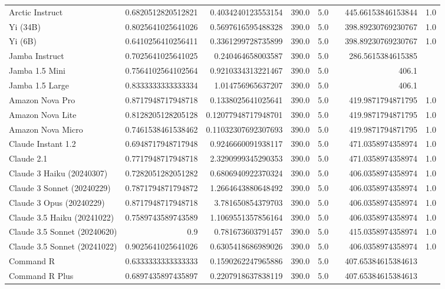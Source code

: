 \begin{table}[htp]
{\begin{tabular}{lrrrrrrr}
Arctic Instruct & 0.6820512820512821 & 0.4034240123553154 & 390.0 & 5.0 &  & 445.66153846153844 & 1.0 \\
Yi (34B) & 0.8025641025641026 & 0.5697616595488328 & 390.0 & 5.0 &  & 398.89230769230767 & 1.0 \\
Yi (6B) & 0.6410256410256411 & 0.3361299728735899 & 390.0 & 5.0 &  & 398.89230769230767 & 1.0 \\
Jamba Instruct & 0.7025641025641025 & 0.240464658003587 & 390.0 & 5.0 &  & 286.5615384615385 &  \\
Jamba 1.5 Mini & 0.7564102564102564 & 0.9210334313221467 & 390.0 & 5.0 &  & 406.1 &  \\
Jamba 1.5 Large & 0.8333333333333334 & 1.014756965637207 & 390.0 & 5.0 &  & 406.1 &  \\
Amazon Nova Pro & 0.8717948717948718 & 0.1338025641025641 & 390.0 & 5.0 &  & 419.9871794871795 & 1.0 \\
Amazon Nova Lite & 0.8128205128205128 & 0.12077948717948701 & 390.0 & 5.0 &  & 419.9871794871795 & 1.0 \\
Amazon Nova Micro & 0.7461538461538462 & 0.11032307692307693 & 390.0 & 5.0 &  & 419.9871794871795 & 1.0 \\
Claude Instant 1.2 & 0.6948717948717948 & 0.9246660091938117 & 390.0 & 5.0 &  & 471.0358974358974 & 1.0 \\
Claude 2.1 & 0.7717948717948718 & 2.3290999345290353 & 390.0 & 5.0 &  & 471.0358974358974 & 1.0 \\
Claude 3 Haiku (20240307) & 0.7282051282051282 & 0.6806940922370324 & 390.0 & 5.0 &  & 406.0358974358974 & 1.0 \\
Claude 3 Sonnet (20240229) & 0.7871794871794872 & 1.2664643880648492 & 390.0 & 5.0 &  & 406.0358974358974 & 1.0 \\
Claude 3 Opus (20240229) & 0.8717948717948718 & 3.781650854379703 & 390.0 & 5.0 &  & 406.0358974358974 & 1.0 \\
Claude 3.5 Haiku (20241022) & 0.7589743589743589 & 1.1069551357856164 & 390.0 & 5.0 &  & 406.0358974358974 & 1.0 \\
Claude 3.5 Sonnet (20240620) & 0.9 & 0.781673603791457 & 390.0 & 5.0 &  & 415.0358974358974 & 1.0 \\
Claude 3.5 Sonnet (20241022) & 0.9025641025641026 & 0.6305418686989026 & 390.0 & 5.0 &  & 406.0358974358974 & 1.0 \\
Command R & 0.6333333333333333 & 0.1590262247965886 & 390.0 & 5.0 &  & 407.65384615384613 &  \\
Command R Plus & 0.6897435897435897 & 0.2207918637838119 & 390.0 & 5.0 &  & 407.65384615384613 &  \\

\end{tabular}}
\end{table}
